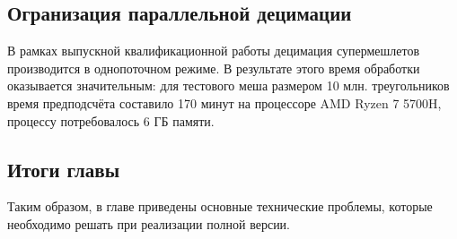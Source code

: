 \subsection*{Огранизация параллельной децимации}
В рамках выпускной квалификационной работы децимация супермешлетов производится в однопоточном режиме.
В результате этого время обработки оказывается значительным: для тестового меша размером 10 млн. треугольников время предподсчёта составило 170 минут на процессоре AMD Ryzen 7 5700H, процессу потребовалось 6 ГБ памяти.

\subsection*{Итоги главы}
Таким образом, в главе приведены основные технические проблемы, которые необходимо решать при реализации полной версии.
